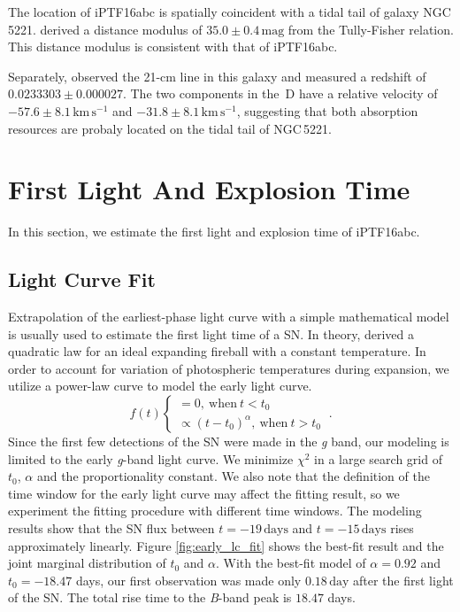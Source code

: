 \documentclass[twocolumn]{aastex61}
\begin{document}
The location of iPTF16abc is spatially coincident with a tidal tail of
galaxy NGC\,5221. \citet{2007A&A...465...71T} derived a distance
modulus of $35.0\pm0.4\,\textrm{mag}$ from the Tully-Fisher
relation. This distance modulus is consistent with that of iPTF16abc.

Separately, \citet{1998A&AS..130..333T} observed the 21-cm line in
this galaxy and measured a redshift of $0.0233303\pm0.000027$.  The
two components in the \,D have a relative velocity of
$-57.6\pm8.1\,\textrm{km}\,\textrm{s}^{-1}$ and
$-31.8\pm8.1\,\textrm{km}\,\textrm{s}^{-1}$, suggesting that both
absorption resources are probaly located on the tidal tail of
NGC\,5221.


\section{First Light And Explosion Time}
\label{sec:first_light}

In this section, we estimate the first light and explosion time of
iPTF16abc.

\subsection{Light Curve Fit}
\label{sec:lc_fit}

Extrapolation of the earliest-phase light curve with a simple
mathematical model is usually used to estimate the first light time of
a SN. In theory, \citet{1982ApJ...253..785A} derived a quadratic law
for an ideal expanding fireball with a constant temperature. In order
to account for variation of photospheric temperatures during
expansion, we utilize a power-law curve to model the early light curve.
\begin{equation}
  \label{eq:broken_power_law}
  f(t) \left\{
    \begin{array}{ll}
      = 0,\ \textrm{when}\ t<t_0 \\
      \propto (t-t_0)^{\alpha},\ \textrm{when}\ t>t_0
    \end{array}
  \right.\ .
\end{equation}
Since the first few detections of the SN were made in the \textit{g}
band, our modeling is limited to the early \textit{g}-band light
curve. We minimize $\chi^2$ in a large search grid of $t_0$, $\alpha$
and the proportionality constant. We also note that the definition of
the time window for the early light curve may affect the fitting
result, so we experiment the fitting procedure with different time
windows. The modeling results show that the SN flux between
$t=-19\,\textrm{days}$ and $t=-15\,\textrm{days}$ rises approximately
linearly. Figure \ref{fig:early_lc_fit} shows the best-fit result and
the joint marginal distribution of $t_0$ and $\alpha$. With the
best-fit model of $\alpha=0.92$ and $t_0=-18.47$ days, our first
observation was made only $0.18\,\textrm{day}$ after the first light
of the SN. The total rise time to the \textit{B}-band peak is $18.47$
days.
\end{document}

